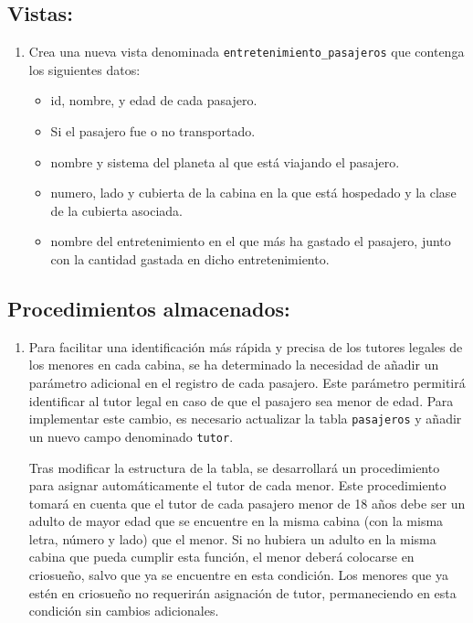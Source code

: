 \documentclass{db-practice}
\begin{document}
\subsection*{Vistas:}

\begin{enumerate}
    \item  Crea una nueva vista denominada \texttt{entretenimiento\_pasajeros} que contenga los siguientes datos:

    \begin{itemize}
        \item id, nombre, y edad de cada pasajero.
        \item Si el pasajero fue o no transportado.
        \item nombre y sistema del planeta al que está viajando el pasajero.
        \item numero, lado y cubierta de la cabina en la que está hospedado y la clase de la cubierta asociada.
        \item nombre del entretenimiento en el que más ha gastado el pasajero, junto con la cantidad gastada en dicho entretenimiento.
    \end{itemize}
\end{enumerate}

\subsection*{Procedimientos almacenados:}

\begin{enumerate}
    \item Para facilitar una identificación más rápida y precisa de los tutores legales de los menores en cada cabina, se ha determinado la necesidad de añadir un parámetro adicional en el registro de cada pasajero. Este parámetro permitirá identificar al tutor legal en caso de que el pasajero sea menor de edad. Para implementar este cambio, es necesario actualizar la tabla \texttt{pasajeros} y añadir un nuevo campo denominado \texttt{tutor}.

    Tras modificar la estructura de la tabla, se desarrollará un procedimiento para asignar automáticamente el tutor de cada menor. Este procedimiento tomará en cuenta que el tutor de cada pasajero menor de 18 años debe ser un adulto de mayor edad que se encuentre en la misma cabina (con la misma letra, número y lado) que el menor. Si no hubiera un adulto en la misma cabina que pueda cumplir esta función, el menor deberá colocarse en criosueño, salvo que ya se encuentre en esta condición. Los menores que ya estén en criosueño no requerirán asignación de tutor, permaneciendo en esta condición sin cambios adicionales.
\end{enumerate}
\end{document}
